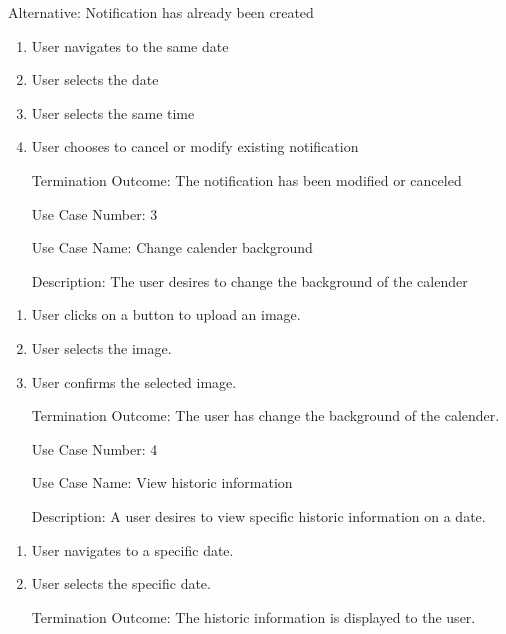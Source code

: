 \documentclass[10pt,conference,onecolumn,compsoc]{IEEEtran}
\begin{document}
Alternative: Notification has already been created
\begin{enumerate}
\item User navigates to the same date
\item User selects the date
\item User selects the same time
\item User chooses to cancel or modify existing notification
\item[Termination Outcome:] The notification has been modified or canceled
\end{enumerate}

\begin{itemize}
\item[Use Case Number:]3
\item[Use Case Name:] Change calender background
\item[Description:] The user desires to change the background of the calender 

\end{itemize}

\begin{enumerate}
\item User clicks on a button to upload an image.
\item User selects the image.
\item User confirms the selected image.
\item[Termination Outcome:] The user has change the background of the calender.
\end{enumerate}

\begin{itemize}
\item[Use Case Number:]4
\item[Use Case Name:] View historic information
\item[Description:] A user desires to view specific historic information on a date.

\end{itemize}

\begin{enumerate}
\item User navigates to a specific date.
\item User selects the specific date.
\item[Termination Outcome:] The historic information is displayed to the user.
\end{enumerate}
\end{document}
